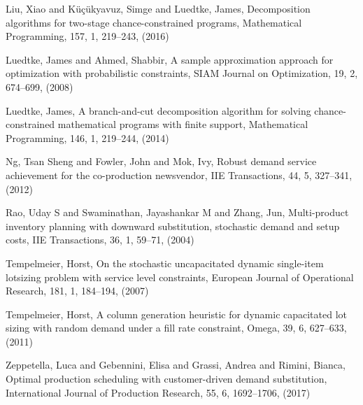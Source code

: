 \documentclass[10pt]{article}
\begin{document}
\begin{thebibliography}{99}
Liu, Xiao and K{\"u}{\c{c}}{\"u}kyavuz, Simge and Luedtke, James, 
Decomposition algorithms for two-stage chance-constrained programs, Mathematical Programming, 157,
  1, 219--243, (2016)
 

Luedtke, James and Ahmed, Shabbir, A sample approximation approach for optimization with probabilistic constraints, 
SIAM Journal on Optimization, 19,
2, 674--699, (2008)


  Luedtke, James, A branch-and-cut decomposition algorithm for solving chance-constrained mathematical programs with finite support,
  Mathematical Programming, 146, 1, 219--244,
 (2014)

Ng, Tsan Sheng and Fowler, John and Mok, Ivy, Robust demand service achievement for the co-production newsvendor, IIE Transactions,
  44,
  5,
 327--341,
  (2012)
  
 Rao, Uday S and Swaminathan, Jayashankar M and Zhang, Jun,
 Multi-product inventory planning with downward substitution, stochastic demand and setup costs,
 IIE Transactions, 36, 1, 59--71, (2004)
 
Tempelmeier, Horst, On the stochastic uncapacitated dynamic single-item lotsizing problem with service level constraints, European Journal of Operational Research, 181, 1, 184--194, (2007)
 

Tempelmeier, Horst, A column generation heuristic for dynamic capacitated lot sizing with random demand under a fill rate constraint, Omega, 39, 6, 627--633, (2011)
 

Zeppetella, Luca and Gebennini, Elisa and Grassi, Andrea and Rimini, Bianca, Optimal production scheduling with customer-driven demand substitution, International Journal of Production Research, 55, 6, 1692--1706, (2017)


 



\end{thebibliography}
\end{document}
